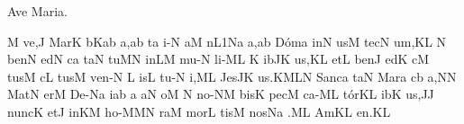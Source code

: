 \beginhymn Ave Maria.

\Internote
\nosolesmescustos
\initiumgregorianum
{}%
\sgn {}{-}{}\punctum M\egn
\sgn ve,\punctum J\egn
\spatium
\sgn Ma{r}\punctum K\egn
\sgn {}{\'\i}{-}\bmolle b\scandicus Kab\egn
\sgn {}a,\punctum a\augmentum b\egn
\spatium
\divisiominima\asteriscus\spatium
t\punctum a\egn
\sgn {}i{-}\punctum N\egn
\sgn {}a{}\punctum M\egn
\spatium
{}n\episem L1\pes Na\egn
\sgn {}a,\punctum a\augmentum b\egn
\spatium
\sgn D{\'o}{m}\punctum a\egn
\sgn {}i{n}\punctum N\egn
\sgn {}us\punctum M\egn
\spatium
\sgn t{e}{c}\punctum N\egn
\sgn {}u{m,}\punctum K\augmentum L\egn
\spatium
\divisiominor
\spatium
\custos N
\lineaproxima
\sgn be{n}\punctum N\egn
\sgn {}e{d}\punctum N\egn
\sgn {}{\'\i}c\punctum a\egn
\sgn ta{}\punctum N\egn
\spatium
\sgn tu{}\punctum M\augmentum N\egn
\spatium
\divisiominima
\spatium
\sgn {}in\pes LM\egn
\spatium
\sgn mu{-}\punctum N\egn
\sgn li{-}\clivis ML\egn
{}\punctum K\egn
\sgn {}i{b}\pes JK\egn
\sgn {}u{s,}\punctum K\augmentum L\egn
\spatium
\divisiominor
\spatium
\sgn {}et\punctum L\egn
\spatium
\sgn be{n}\punctum J\egn
\sgn {}e{d}\punctum K\egn
\sgn {}{\'\i}c\punctum M\egn
\sgn tus\punctum M\egn
\spatium
{}c\punctum L\egn
\sgn tus\punctum M\egn
\spatium
\sgn v{e}{n-}\punctum N\egn
\custos L
\lineaproxima
{}is\punctum L\egn
\spatium
\sgn t{u}{-}\punctum N\egn
\sgn {}i,\clivis ML\egn
\spatium
\sgn J{e}{s}\pes JK\egn
\sgn {}u{s.}\pes KM\augmentumduplex LN\egn
\spatium
\divisiofinalis
\spatium
\sgn Sa{nc}\punctum a\egn
\sgn ta{}\punctum N\egn
\spatium
\sgn Ma{r}\punctum a\egn
\sgn {}{\'\i}{-}\clivis cb\egn
\sgn {}a,\punctum N\augmentum N\egn
\spatium
\sgn M{a}{t}\punctum N\egn
\sgn {}er\punctum M\egn
\spatium
\sgn D{e}{-}\pes Na\egn
\sgn {}i{}\punctum a\augmentum b\egn
\spatium\divisiominor\spatium
\punctum a\egn
\sgn {}a{}\punctum N\egn
\spatium
{}o{}\punctum M\egn
\spatium
\custos N
\lineaproxima
\sgn n{o}{-}\clivis NM\egn
\sgn bis\punctum K\egn
\spatium
\sgn pec\punctum M\egn
\sgn ca{-}\clivis ML\egn
\sgn t{\'o}{r}\pes KL\egn
\sgn {}i{b}\punctum K\egn
\sgn {}u{s,}\punctum J\augmentum J\egn
\spatium\divisiominor\spatium
\sgn nu{nc}\punctum K\egn
\spatium
\sgn {}et\punctum J\egn
\spatium
\sgn {}in\pes KM\egn
\spatium
\sgn h{o}{-}\punctum M\spatiumparvum\pes MN\egn
\sgn ra{}\punctum M\egn
\spatium
\sgn m{o}r\punctum L\egn
\sgn tis\punctum M\egn
\spatium
\sgn n{o}s\pes Na\egn
{}.\clivis ML\egn
\spatium
\sgn {}Am\punctum K\augmentum L\egn
\sgn {}e{n.}\punctum K\augmentum L\egn
\Finisgregoriana

\bigskip

